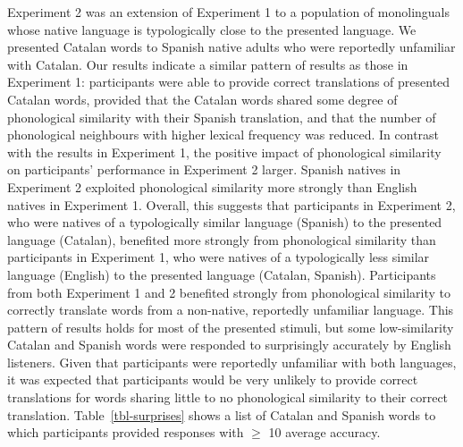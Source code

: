 \documentclass[
  man,
  longtable,
  nolmodern,
  notxfonts,
  notimes,
  colorlinks=true,linkcolor=blue,citecolor=blue,urlcolor=blue]{apa7}
\begin{document}
Experiment 2 was an extension of Experiment 1 to a population of
monolinguals whose native language is typologically close to the
presented language. We presented Catalan words to Spanish native adults
who were reportedly unfamiliar with Catalan. Our results indicate a
similar pattern of results as those in Experiment 1: participants were
able to provide correct translations of presented Catalan words,
provided that the Catalan words shared some degree of phonological
similarity with their Spanish translation, and that the number of
phonological neighbours with higher lexical frequency was reduced. In
contrast with the results in Experiment 1, the positive impact of
phonological similarity on participants' performance in Experiment 2
larger. Spanish natives in Experiment 2 exploited phonological
similarity more strongly than English natives in Experiment 1. Overall,
this suggests that participants in Experiment 2, who were natives of a
typologically similar language (Spanish) to the presented language
(Catalan), benefited more strongly from phonological similarity than
participants in Experiment 1, who were natives of a typologically less
similar language (English) to the presented language (Catalan, Spanish).
Participants from both Experiment 1 and 2 benefited strongly from
phonological similarity to correctly translate words from a non-native,
reportedly unfamiliar language. This pattern of results holds for most
of the presented stimuli, but some low-similarity Catalan and Spanish
words were responded to surprisingly accurately by English listeners.
Given that participants were reportedly unfamiliar with both languages,
it was expected that participants would be very unlikely to provide
correct translations for words sharing little to no phonological
similarity to their correct translation. Table~\ref{tbl-surprises} shows
a list of Catalan and Spanish words to which participants provided
responses with \(\geq\) 10 average accuracy.
\end{document}

